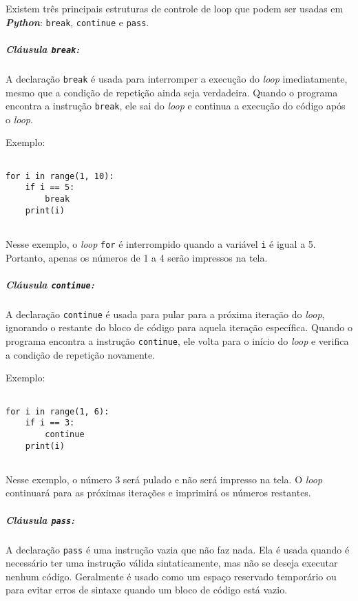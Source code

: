 \documentclass[a4paper, 12pt, onecolumn,singlespacing]{article}
\begin{document}
	Existem três principais estruturas de controle de loop que podem ser usadas em \textbf{\textit{Python}}: \texttt{break}, \texttt{continue} e \texttt{pass}.
	
	\subparagraph{Cláusula \texttt{break}:}
	\label{python_clausula_break}
	 A declaração \texttt{break} é usada para interromper a execução do \textit{loop} imediatamente, mesmo que a condição de repetição ainda seja verdadeira. Quando o programa encontra a instrução \texttt{break}, ele sai do \textit{loop} e continua a execução do código após o \textit{loop}.
	
	Exemplo:
	
	\begin{verbatim}
		
for i in range(1, 10):
	if i == 5:
		break
	print(i)
		
	\end{verbatim}
	\label{clausula_break}
	
	Nesse exemplo, o \textit{loop} \texttt{for} é interrompido quando a variável \texttt{i} é igual a 5. Portanto, apenas os números de 1 a 4 serão impressos na tela.
	
	\subparagraph{Cláusula \texttt{continue}:}
	\label{python_clausula_continue}
	A declaração \texttt{continue} é usada para pular para a próxima iteração do \textit{loop}, ignorando o restante do bloco de código para aquela iteração específica. Quando o programa encontra a instrução \texttt{continue}, ele volta para o início do \textit{loop} e verifica a condição de repetição novamente.
	
	Exemplo:
	
	\begin{verbatim}
		
for i in range(1, 6):
	if i == 3:
		continue
	print(i)
	
	\end{verbatim}
	\label{clausula_continue}
	
Nesse exemplo, o número 3 será pulado e não será impresso na tela. O \textit{loop} continuará para as próximas iterações e imprimirá os números restantes.

	\subparagraph{Cláusula \texttt{pass}:}
	\label{python_clausula_pass}
	A declaração \texttt{pass} é uma instrução vazia que não faz nada. Ela é usada quando é necessário ter uma instrução válida sintaticamente, mas não se deseja executar nenhum código. Geralmente é usado como um espaço reservado temporário ou para evitar erros de sintaxe quando um bloco de código está vazio.
	
\end{document}

